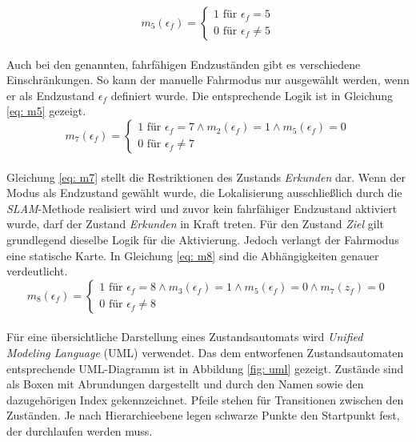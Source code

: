		
				\begin{equation}
					m_5(\epsilon_f)=\left\{\begin{array}{ll} 1 \text{ für } \epsilon_f=5 \\
						0 \text{ für }\epsilon_f\neq 5\end{array}\right. 
					\label{eq: m5}
				\end{equation}\\
			
		Auch bei den genannten, fahrfähigen Endzuständen gibt es verschiedene Einschränkungen. So kann der manuelle Fahrmodus nur ausgewählt werden, wenn er als Endzustand $\epsilon_f$ definiert wurde. Die entsprechende Logik ist in Gleichung \ref{eq: m5} gezeigt.\\
		
				\begin{equation}
					m_7(\epsilon_f)=\left\{\begin{array}{ll} 1 \text{ für } \epsilon_f=7 \wedge m_2(\epsilon_f)=1 \wedge m_5(\epsilon_f)=0 \\
						0 \text{ für }\epsilon_f\neq 7\end{array}\right.
					\label{eq: m7}
				\end{equation}\\
				
		Gleichung \ref{eq: m7} stellt die Restriktionen des Zustands \textit{Erkunden} dar. Wenn der Modus als Endzustand gewählt wurde, die Lokalisierung ausschließlich durch die \textit{SLAM}-Methode realisiert wird und zuvor kein fahrfähiger Endzustand aktiviert wurde, darf der Zustand \textit{Erkunden} in Kraft treten. Für den Zustand \textit{Ziel} gilt grundlegend dieselbe Logik für die Aktivierung. Jedoch verlangt der Fahrmodus eine statische Karte. In Gleichung \ref{eq: m8} sind die Abhängigkeiten genauer verdeutlicht.\\
		
		
				\begin{equation}
					m_8(\epsilon_f)=\left\{\begin{array}{ll} 1 \text{ für } \epsilon_f=8 \wedge m_3(\epsilon_f)=1 \wedge m_5(\epsilon_f)=0 \wedge m_7(z_f)=0 \\
						0 \text{ für }\epsilon_f\neq 8\end{array}\right.
					\label{eq: m8}
				\end{equation}\\
		
		Für eine übersichtliche Darstellung eines Zustandsautomats wird \textit{Unified Modeling Language} (UML) verwendet. Das dem entworfenen Zustandsautomaten entsprechende UML-Diagramm ist in Abbildung \ref{fig: uml} gezeigt. Zustände sind als Boxen mit Abrundungen dargestellt und durch den Namen sowie den dazugehörigen Index gekennzeichnet. Pfeile stehen für Transitionen zwischen den Zuständen. Je nach Hierarchieebene legen schwarze Punkte den Startpunkt fest, der durchlaufen werden muss. 
		
